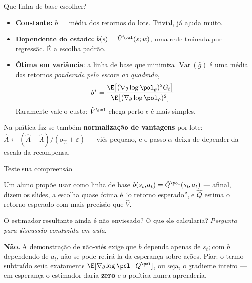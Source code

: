 \documentclass[aspectratio=169, 11pt]{beamer}
\newcommand{\paradiscussao}{\smallskip
  {\footnotesize\color{rlCinza}\itshape Pergunta para discussão conduzida em aula.}}
\newcommand{\thv}{\theta}                       %
\newcommand{\wv}{w}                             %
\newcommand{\polth}{\pol_{\thv}}                %
\newcommand{\gth}{\nabla_{\thv}}                %
\newcommand{\Vhat}{\hat{V}}
\newcommand{\Qhat}{\hat{Q}}
\newcommand{\Ahat}{\hat{A}}
\newcommand{\Var}{\operatorname{Var}}
\begin{document}
\begin{frame}{Que linha de base escolher?}

  \begin{itemize}\setlength{\itemsep}{0.45ex}
    \item \textbf{Constante:} $b = $ média dos retornos do lote. Trivial,
      já ajuda muito.
    \item \textbf{Dependente do estado:} $b(s) = \Vhat^{\pol}(s;\wv)$, uma
      rede treinada por regressão. É a escolha padrão.
    \item \textbf{Ótima em variância:} a linha de base que minimiza
      $\Var(\hat g)$ é uma média dos retornos \emph{ponderada pelo escore ao
      quadrado},
      \[
        b^{*} = \frac{\E\bigl[(\gth\log\polth)^2 G_t\bigr]}
                     {\E\bigl[(\gth\log\polth)^2\bigr]}
      \]
      Raramente vale o custo: $\Vhat^{\pol}$ chega perto e é mais simples.
  \end{itemize}

  \begin{alertabox}
    Na prática faz-se também \textbf{normalização de vantagens} por lote:
    $\Ahat \leftarrow (\Ahat - \bar{\Ahat})/(\sigma_{\Ahat} + \varepsilon)$ ---
    viés pequeno, e o passo $\alpha$ deixa de depender da escala da recompensa.
  \end{alertabox}
\end{frame}

\begin{frame}{Teste sua compreensão}

  \begin{quizbox}{}
    Um aluno propõe usar como linha de base
    $b(s_t,a_t) = \Qhat^{\pol}(s_t,a_t)$ --- afinal, dizem os slides, a
    escolha quase ótima é ``o retorno esperado'', e $\Qhat$ estima o retorno
    esperado com mais precisão que $\Vhat$.

    \smallskip
    O estimador resultante ainda é não enviesado? O que ele calcularia?
    \paradiscussao
  \end{quizbox}

  \pause

  \begin{respbox}
    \textbf{Não.} A demonstração de não-viés exige que $b$ dependa apenas de
    $s_t$; com $b$ dependendo de $a_t$, não se pode retirá-la da esperança
    sobre ações. Pior: o termo subtraído seria exatamente
    $\E[\gth\log\pol \cdot Q^{\pol}]$, ou seja, o gradiente inteiro --- em
    esperança o estimador daria \textbf{zero} e a política nunca aprenderia.
  \end{respbox}
\end{frame}
\end{document}
